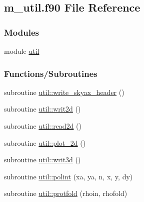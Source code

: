 \hypertarget{m__util_8f90}{}\subsection{m\+\_\+util.\+f90 File Reference}
\label{m__util_8f90}
\subsubsection*{Modules}
\begin{DoxyCompactItemize}
\item 
module \hyperlink{namespaceutil}{util}
\end{DoxyCompactItemize}
\subsubsection*{Functions/\+Subroutines}
\begin{DoxyCompactItemize}
\item 
subroutine \hyperlink{namespaceutil_aac4992cc592b0d0683d9cb2a87ebddd5}{util\+::write\+\_\+skyax\+\_\+header} ()
\item 
subroutine \hyperlink{namespaceutil_aa9bfa6660c51896cbd65a21cdaa39082}{util\+::writ2d} ()
\item 
subroutine \hyperlink{namespaceutil_a069d437605f9b9b092ea89b615d8c25a}{util\+::read2d} ()
\item 
subroutine \hyperlink{namespaceutil_aa9b0a6c5e567c5d51bff6bddd9f44a9b}{util\+::plot\+\_\+2d} ()
\item 
subroutine \hyperlink{namespaceutil_a9117111f9dd66d8c3f70c4f386bb9729}{util\+::writ3d} ()
\item 
subroutine \hyperlink{namespaceutil_a0a5db2f39cbcc56ea6720c6c394d2349}{util\+::polint} (xa, ya, n, x, y, dy)
\item 
subroutine \hyperlink{namespaceutil_af8c8a5bf64f2cb86380d62663ee08273}{util\+::protfold} (rhoin, rhofold)
\end{DoxyCompactItemize}
